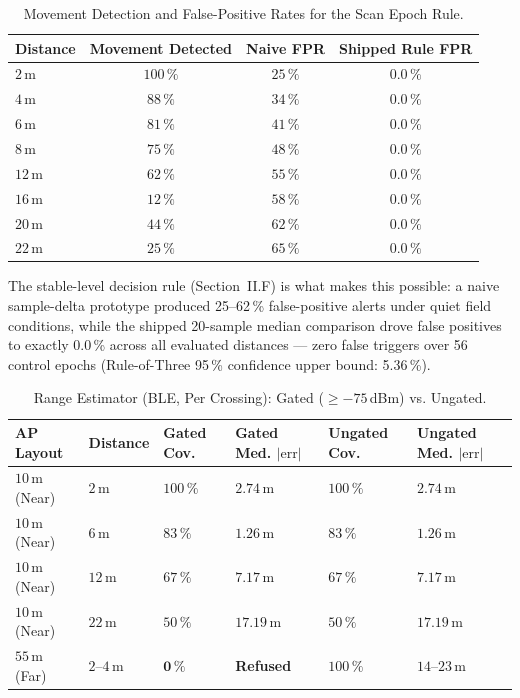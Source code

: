 \documentclass[journal,10pt]{IEEEtran}
\begin{document}
\begin{table}[htb!]
  \centering
  \caption{Movement Detection and False-Positive Rates for the Scan Epoch Rule.}
  \label{tab:epoch}
  \footnotesize
  \begin{tabular}{@{}lccc@{}}
    \toprule
    Distance & Movement Detected & Naive FPR & Shipped Rule FPR \\
    \midrule
    $2$\,m  & $100\,\%$ & $25\,\%$ & $\mathbf{0.0\,\%}$ \\
    $4$\,m  & $88\,\%$  & $34\,\%$ & $\mathbf{0.0\,\%}$ \\
    $6$\,m  & $81\,\%$  & $41\,\%$ & $\mathbf{0.0\,\%}$ \\
    $8$\,m  & $75\,\%$  & $48\,\%$ & $\mathbf{0.0\,\%}$ \\
    $12$\,m & $62\,\%$  & $55\,\%$ & $\mathbf{0.0\,\%}$ \\
    $16$\,m & $12\,\%$  & $58\,\%$ & $\mathbf{0.0\,\%}$ \\
    $20$\,m & $44\,\%$  & $62\,\%$ & $\mathbf{0.0\,\%}$ \\
    $22$\,m & $25\,\%$  & $65\,\%$ & $\mathbf{0.0\,\%}$ \\
    \bottomrule
  \end{tabular}
\end{table}

The stable-level decision rule (Section~II.F) is what makes this possible: a
naive sample-delta prototype produced 25--62\,\% false-positive alerts under
quiet field conditions, while the shipped 20-sample median comparison drove
false positives to exactly 0.0\,\% across all evaluated distances --- zero
false triggers over 56 control epochs (Rule-of-Three 95\,\% confidence upper
bound: 5.36\,\%).

\begin{table}[htb!]
  \centering
  \caption{Range Estimator (BLE, Per Crossing): Gated ($\ge -75$\,dBm) vs. Ungated.}
  \label{tab:range_estimator}
  \footnotesize
  \begin{tabular}{@{}p{1.4cm}p{1cm}p{1cm}p{1cm}p{1cm}p{1cm}@{}}
    \toprule
    \textbf{AP Layout} & \textbf{Distance} & \textbf{Gated Cov.} & \textbf{Gated Med. $|\mathrm{err}|$} & \textbf{Ungated Cov.} & \textbf{Ungated Med. $|\mathrm{err}|$} \\
    \midrule
    $10$\,m (Near) & $2$\,m  & $100\,\%$ & $2.74$\,m  & $100\,\%$ & $2.74$\,m  \\
    $10$\,m (Near) & $6$\,m  & $83\,\%$  & $1.26$\,m  & $83\,\%$  & $1.26$\,m  \\
    $10$\,m (Near) & $12$\,m & $67\,\%$  & $7.17$\,m  & $67\,\%$  & $7.17$\,m  \\
    $10$\,m (Near) & $22$\,m & $50\,\%$  & $17.19$\,m & $50\,\%$  & $17.19$\,m \\
    $55$\,m (Far)  & $2$--$4$\,m & $\mathbf{0\,\%}$ & \textbf{Refused} & $100\,\%$ & $14$--$23$\,m \\
    \bottomrule
  \end{tabular}
\end{table}
\end{document}
